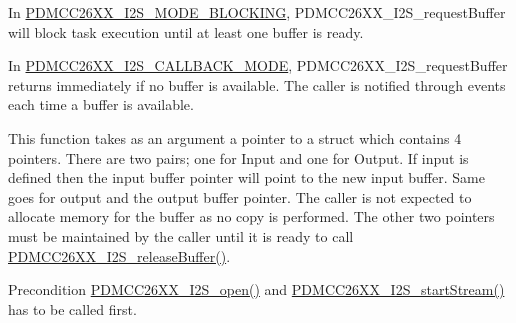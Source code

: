 In \hyperlink{_p_d_m_c_c26_x_x__util_8h_aef896b2a7fc07d3b145f8d02eaa9e377a8a325f16e9c7ea73e9a6571285bf4de6}{P\+D\+M\+C\+C26\+X\+X\+\_\+\+I2\+S\+\_\+\+M\+O\+D\+E\+\_\+\+B\+L\+O\+C\+K\+I\+N\+G}, P\+D\+M\+C\+C26\+X\+X\+\_\+\+I2\+S\+\_\+request\+Buffer will block task execution until at least one buffer is ready.

In \hyperlink{_p_d_m_c_c26_x_x__util_8h_aef896b2a7fc07d3b145f8d02eaa9e377a8b043983d80de30bc3c61f1df84a2212}{P\+D\+M\+C\+C26\+X\+X\+\_\+\+I2\+S\+\_\+\+C\+A\+L\+L\+B\+A\+C\+K\+\_\+\+M\+O\+D\+E}, P\+D\+M\+C\+C26\+X\+X\+\_\+\+I2\+S\+\_\+request\+Buffer returns immediately if no buffer is available. The caller is notified through events each time a buffer is available.

This function takes as an argument a pointer to a struct which contains 4 pointers. There are two pairs; one for Input and one for Output. If input is defined then the input buffer pointer will point to the new input buffer. Same goes for output and the output buffer pointer. The caller is not expected to allocate memory for the buffer as no copy is performed. The other two pointers must be maintained by the caller until it is ready to call \hyperlink{_p_d_m_c_c26_x_x__util_8h_ae6436840c3944258d3bdf041250dd10c}{P\+D\+M\+C\+C26\+X\+X\+\_\+\+I2\+S\+\_\+release\+Buffer()}.

\begin{DoxyPrecond}{Precondition}
\hyperlink{_p_d_m_c_c26_x_x__util_8h_a8168bcdab9f1e46c26823555df6f797f}{P\+D\+M\+C\+C26\+X\+X\+\_\+\+I2\+S\+\_\+open()} and \hyperlink{_p_d_m_c_c26_x_x__util_8h_ac318829ebbf5e66a0ee0c23ba3b36ba4}{P\+D\+M\+C\+C26\+X\+X\+\_\+\+I2\+S\+\_\+start\+Stream()} has to be called first.
\end{DoxyPrecond}

